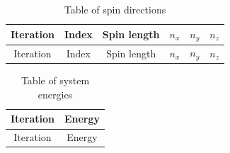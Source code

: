 \documentclass[12pt,a4paper]{article}
\numberwithin{equation}{section}
\numberwithin{figure}{section}
\numberwithin{table}{section}
\begin{document}
	
	
	\clearpage
	
	\begin{longtable}{|c|c|c|c|c|c|}
		\caption{Table of spin directions}
		\label{tab:spindirection}\\
		\hline
		Iteration & Index & Spin length & \(n_x\) & \(n_y\) & \(n_z\)\\
		\hline
		\endfirsthead
		
		\hline
		Iteration & Index & Spin length & \(n_x\) & \(n_y\) & \(n_z\)\\
		\hline
		\endhead
		
	\end{longtable}
	
	\clearpage
	
	\begin{longtable}{|c|c|}
		\caption{Table of system energies}
		\label{tab:energy}\\
		\hline
		Iteration & Energy\\
		\hline
		\endfirsthead
		
		\hline
		Iteration & Energy\\
		\hline
		\endhead
		
	\end{longtable}
	
\end{document}
